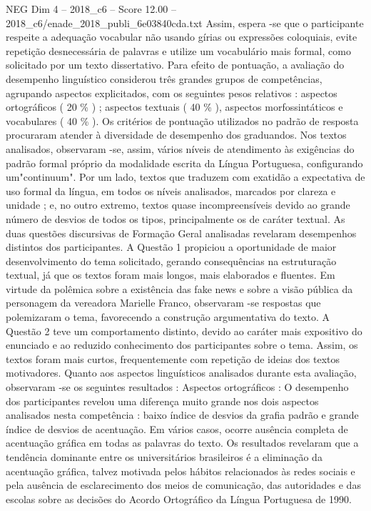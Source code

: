 \begin{textsample}{NEG Dim 4 – 2018\_c6 – Score 12.00 – 2018\_c6/enade\_2018\_publi\_6e03840cda.txt}
Assim, espera -se que o participante respeite a adequação vocabular não usando gírias ou expressões coloquiais, evite repetição desnecessária de palavras e utilize um vocabulário mais formal, como solicitado por um texto dissertativo.
Para efeito de pontuação, a avaliação do desempenho linguístico considerou três grandes grupos de competências, agrupando aspectos explicitados, com os seguintes pesos relativos : aspectos ortográficos ( 20 \% ) ; aspectos textuais ( 40 \% ), aspectos morfossintáticos e vocabulares ( 40 \% ).
Os critérios de pontuação utilizados no padrão de resposta procuraram atender à diversidade de desempenho dos graduandos.
Nos textos analisados, observaram -se, assim, vários níveis de atendimento às exigências do padrão formal próprio da modalidade escrita da Língua Portuguesa, configurando um"continuum".
Por um lado, textos que traduzem com exatidão a expectativa de uso formal da língua, em todos os níveis analisados, marcados por clareza e unidade ; e, no outro extremo, textos quase incompreensíveis devido ao grande número de desvios de todos os tipos, principalmente os de caráter textual.
As duas questões discursivas de Formação Geral analisadas revelaram desempenhos distintos dos participantes.
A Questão 1 propiciou a oportunidade de maior desenvolvimento do tema solicitado, gerando consequências na estruturação textual, já que os textos foram mais longos, mais elaborados e fluentes.
Em virtude da polêmica sobre a existência das fake news e sobre a visão pública da personagem da vereadora Marielle Franco, observaram -se respostas que polemizaram o tema, favorecendo a construção argumentativa do texto.
A Questão 2 teve um comportamento distinto, devido ao caráter mais expositivo do enunciado e ao reduzido conhecimento dos participantes sobre o tema.
Assim, os textos foram mais curtos, frequentemente com repetição de ideias dos textos motivadores.
Quanto aos aspectos linguísticos analisados durante esta avaliação, observaram -se os seguintes resultados : Aspectos ortográficos : O desempenho dos participantes revelou uma diferença muito grande nos dois aspectos analisados nesta competência : baixo índice de desvios da grafia padrão e grande índice de desvios de acentuação.
Em vários casos, ocorre ausência completa de acentuação gráfica em todas as palavras do texto.
Os resultados revelaram que a tendência dominante entre os universitários brasileiros é a eliminação da acentuação gráfica, talvez motivada pelos hábitos relacionados às redes sociais e pela ausência de esclarecimento dos meios de comunicação, das autoridades e das escolas sobre as decisões do Acordo Ortográfico da Língua Portuguesa de 1990.

\end{textsample}
